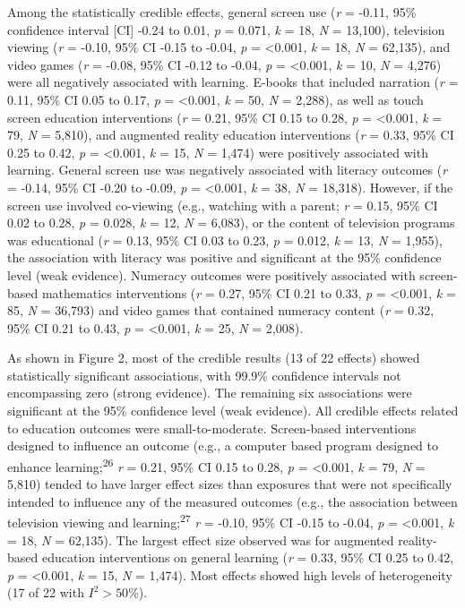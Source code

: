 \documentclass[
  english,
  man]{apa6}
\begin{document}
Among the statistically credible effects, general screen use (\emph{r} = -0.11, 95\% confidence interval {[}CI{]} -0.24 to 0.01, \emph{p} = 0.071, \emph{k} = 18, \emph{N} = 13,100), television viewing (\emph{r} = -0.10, 95\% CI -0.15 to -0.04, \emph{p} = \textless0.001, \emph{k} = 18, \emph{N} = 62,135), and video games (\emph{r} = -0.08, 95\% CI -0.12 to -0.04, \emph{p} = \textless0.001, \emph{k} = 10, \emph{N} = 4,276) were all negatively associated with learning.
E-books that included narration (\emph{r} = 0.11, 95\% CI 0.05 to 0.17, \emph{p} = \textless0.001, \emph{k} = 50, \emph{N} = 2,288), as well as touch screen education interventions (\emph{r} = 0.21, 95\% CI 0.15 to 0.28, \emph{p} = \textless0.001, \emph{k} = 79, \emph{N} = 5,810), and augmented reality education interventions (\emph{r} = 0.33, 95\% CI 0.25 to 0.42, \emph{p} = \textless0.001, \emph{k} = 15, \emph{N} = 1,474) were positively associated with learning.
General screen use was negatively associated with literacy outcomes (\emph{r} = -0.14, 95\% CI -0.20 to -0.09, \emph{p} = \textless0.001, \emph{k} = 38, \emph{N} = 18,318).
However, if the screen use involved co-viewing (e.g., watching with a parent; \emph{r} = 0.15, 95\% CI 0.02 to 0.28, \emph{p} = 0.028, \emph{k} = 12, \emph{N} = 6,083), or the content of television programs was educational (\emph{r} = 0.13, 95\% CI 0.03 to 0.23, \emph{p} = 0.012, \emph{k} = 13, \emph{N} = 1,955), the association with literacy was positive and significant at the 95\% confidence level (weak evidence).
Numeracy outcomes were positively associated with screen-based mathematics interventions (\emph{r} = 0.27, 95\% CI 0.21 to 0.33, \emph{p} = \textless0.001, \emph{k} = 85, \emph{N} = 36,793) and video games that contained numeracy content (\emph{r} = 0.32, 95\% CI 0.21 to 0.43, \emph{p} = \textless0.001, \emph{k} = 25, \emph{N} = 2,008).

As shown in Figure 2, most of the credible results (13 of 22 effects) showed statistically significant associations, with 99.9\% confidence intervals not encompassing zero (strong evidence).
The remaining six associations were significant at the 95\% confidence level (weak evidence).
All credible effects related to education outcomes were small-to-moderate.
Screen-based interventions designed to influence an outcome (e.g., a computer based program designed to enhance learning;\textsuperscript{26} \emph{r} = 0.21, 95\% CI 0.15 to 0.28, \emph{p} = \textless0.001, \emph{k} = 79, \emph{N} = 5,810) tended to have larger effect sizes than exposures that were not specifically intended to influence any of the measured outcomes (e.g., the association between television viewing and learning;\textsuperscript{27} \emph{r} = -0.10, 95\% CI -0.15 to -0.04, \emph{p} = \textless0.001, \emph{k} = 18, \emph{N} = 62,135).
The largest effect size observed was for augmented reality-based education interventions on general learning (\emph{r} = 0.33, 95\% CI 0.25 to 0.42, \emph{p} = \textless0.001, \emph{k} = 15, \emph{N} = 1,474).
Most effects showed high levels of heterogeneity (17 of 22 with \(I^2 > 50\%\)).
\end{document}
